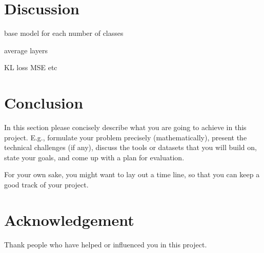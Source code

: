\documentclass{article}
\begin{document}
\section{Discussion}

base model for each number of classes

average layers

KL loss MSE etc

\section{Conclusion}
In this section please concisely describe what you are going to achieve in this project. E.g., formulate your problem precisely (mathematically), present the technical challenges (if any), discuss the tools or datasets that you will build on, state your goals, and come up with a plan for evaluation.

For your own sake, you might want to lay out a time line, so that you can keep a good track of your project.

\newpage

\section*{Acknowledgement}
Thank people who have helped or influenced you in this project.

\nocite{*}



\end{document}
